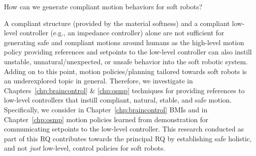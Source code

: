 \begin{researchquestion}\label{rq:compliant_motion_behaviors}
    How can we generate compliant motion behaviors for soft robots?
\end{researchquestion}
A compliant structure (provided by the material softness) and a compliant low-level controller (e.g., an impedance controller) alone are not sufficient for generating safe and compliant motions around humans as the high-level motion policy providing references and setpoints to the low-level controller can also instill unstable, unnatural/unexpected, or unsafe behavior into the soft robotic system.
Adding on to this point, motion policies/planning tailored towards soft robots is an underexplored topic in general.
Therefore, we investigate in Chapters~\ref{chp:braincontrol} \& \ref{chp:osmp} techniques for providing references to low-level controllers that instill compliant, natural, stable, and safe motion.
Specifically, we consider in Chapter~\ref{chp:braincontrol} \glspl{BMI} and in Chapter~\ref{chp:osmp} motion policies learned from demonstration for communicating setpoints to the low-level controller.
This research conducted as part of this \gls{RQ} contributes towards the principal \gls{RQ} by establishing safe holistic, and not \emph{just} low-level, control policies for soft robots.

